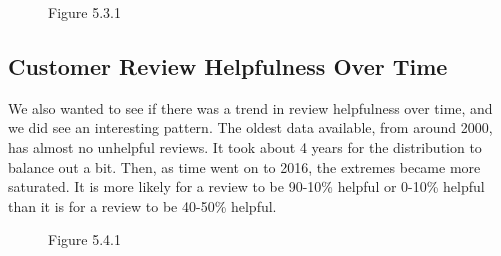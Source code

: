 \documentclass[11pt]{article}
\begin{document}
\begin{figure}[!htb]
\begin{center}
Figure 5.3.1
\end{center}
\end{figure}

\subsection{Customer Review Helpfulness Over Time}

We also wanted to see if there was a trend in review helpfulness over time, and we did see an interesting pattern. The oldest data available, from around 2000, has almost no unhelpful reviews. It took about 4 years for the distribution to balance out a bit. Then, as time went on to 2016, the extremes became more saturated. It is more likely for a review to be 90-10\% helpful or 0-10\% helpful than it is for a review to be 40-50\% helpful. 

\begin{figure}[!htb]
\begin{center}
Figure 5.4.1
\end{center}
\end{figure}
\end{document}
